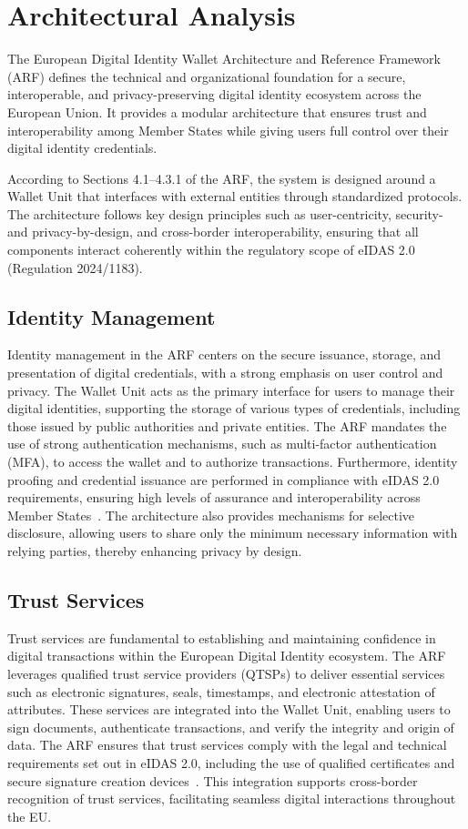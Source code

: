 \documentclass[sigconf,balance,nonacm,authordraft]{acmart}
\begin{document}
\section{Architectural Analysis}
\label{sec:ArchitecturalAnalysis}
The European Digital Identity Wallet Architecture and Reference Framework (ARF) defines the technical and organizational foundation for a secure, interoperable, and privacy-preserving digital identity ecosystem across the European Union.
It provides a modular architecture that ensures trust and interoperability among Member States while giving users full control over their digital identity credentials.

According to Sections 4.1–4.3.1 of the ARF, the system is designed around a Wallet Unit that interfaces with external entities through standardized protocols.
The architecture follows key design principles such as user-centricity, security- and privacy-by-design, and cross-border interoperability, ensuring that all components interact coherently within the regulatory scope of eIDAS 2.0 (Regulation 2024/1183).

\subsection{Identity Management}
Identity management in the ARF centers on the secure issuance, storage, and presentation of digital credentials, with a strong emphasis on user control and privacy. The Wallet Unit acts as the primary interface for users to manage their digital identities, supporting the storage of various types of credentials, including those issued by public authorities and private entities. The ARF mandates the use of strong authentication mechanisms, such as multi-factor authentication (MFA), to access the wallet and to authorize transactions. Furthermore, identity proofing and credential issuance are performed in compliance with eIDAS 2.0 requirements, ensuring high levels of assurance and interoperability across Member States~\cite{EU_ARF2024,EU_eIDAS2024}. The architecture also provides mechanisms for selective disclosure, allowing users to share only the minimum necessary information with relying parties, thereby enhancing privacy by design.

\subsection{Trust Services}
Trust services are fundamental to establishing and maintaining confidence in digital transactions within the European Digital Identity ecosystem. The ARF leverages qualified trust service providers (QTSPs) to deliver essential services such as electronic signatures, seals, timestamps, and electronic attestation of attributes. These services are integrated into the Wallet Unit, enabling users to sign documents, authenticate transactions, and verify the integrity and origin of data. The ARF ensures that trust services comply with the legal and technical requirements set out in eIDAS 2.0, including the use of qualified certificates and secure signature creation devices~\cite{EU_ARF2024,EU_eIDAS2024}. This integration supports cross-border recognition of trust services, facilitating seamless digital interactions throughout the EU.
\end{document}
